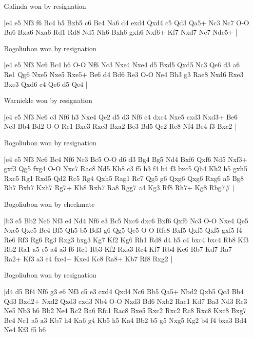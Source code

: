 \showboard

Galinda won by resignation

\makegametitle
|e4 e5 Nf3 f6 Bc4 b5 Bxb5 c6 Bc4 Na6 d4 exd4 Qxd4 c5 Qd3 Qa5+ Nc3 Nc7 O-O Ba6 Bxa6 Nxa6 Rd1 Rd8 Nd5 Nh6 Bxh6 gxh6 Nxf6+ Kf7 Nxd7 Nc7 Nde5+  |

\showboard

Bogoliubon won by resignation

\makegametitle
|e4 e5 Nf3 Nc6 Bc4 h6 O-O Nf6 Nc3 Nxe4 Nxe4 d5 Bxd5 Qxd5 Nc3 Qe6 d3 a6 Re1 Qg6 Nxe5 Nxe5 Rxe5+ Be6 d4 Bd6 Re3 O-O Ne4 Bh3 g3 Rae8 Nxd6 Rxe3 Bxe3 Qxd6 c4 Qe6 d5 Qe4  |

\showboard

Warnickle won by resignation

\makegametitle
|e4 e5 Nf3 Nc6 c3 Nf6 h3 Nxe4 Qe2 d5 d3 Nf6 c4 dxc4 Nxe5 cxd3 Nxd3+ Be6 Nc3 Bb4 Bd2 O-O Rc1 Bxc3 Rxc3 Bxa2 Be3 Bd5 Qc2 Re8 Nf4 Be4 f3 Bxc2  |

\showboard

Bogoliubon won by resignation

\makegametitle
|e4 e5 Nf3 Nc6 Bc4 Nf6 Nc3 Bc5 O-O d6 d3 Bg4 Bg5 Nd4 Bxf6 Qxf6 Nd5 Nxf3+ gxf3 Qg5 fxg4 O-O Nxc7 Rac8 Nd5 Kh8 c3 f5 h3 f4 b4 f3 bxc5 Qh4 Kh2 h5 gxh5 Rxc5 Rg1 Rxd5 Qd2 Rc5 Rg4 Qxh5 Rag1 Rc7 Qg5 g6 Qxg6 Qxg6 Rxg6 a5 Bg8 Rh7 Bxh7 Kxh7 Rg7+ Kh8 Rxb7 Ra8 Rgg7 a4 Kg3 Rf8 Rh7+ Kg8 Rbg7\#  |

\showboard

Bogoliubon won by checkmate

\makegametitle
|b3 e5 Bb2 Nc6 Nf3 e4 Nd4 Nf6 e3 Bc5 Nxc6 dxc6 Bxf6 Qxf6 Nc3 O-O Nxe4 Qe5 Nxc5 Qxc5 Bc4 Bf5 Qh5 b5 Bd3 g6 Qg5 Qe5 O-O Rfe8 Bxf5 Qxf5 Qxf5 gxf5 f4 Re6 Rf3 Rg6 Rg3 Rxg3 hxg3 Kg7 Kf2 Kg6 Rh1 Rd8 d4 h5 c4 bxc4 bxc4 Rb8 Kf3 Rb2 Ra1 a5 c5 a4 a3 f6 Rc1 Rb3 Kf2 Rxa3 Rc4 Kf7 Rb4 Ke6 Rb7 Kd7 Ra7 Ra2+ Kf3 a3 e4 fxe4+ Kxe4 Kc8 Ra8+ Kb7 Rf8 Rxg2  |

\showboard

Bogoliubon won by resignation

\makegametitle
|d4 d5 Bf4 Nf6 g3 e6 Nf3 c5 e3 cxd4 Qxd4 Nc6 Bb5 Qa5+ Nbd2 Qxb5 Qc3 Bb4 Qd3 Bxd2+ Nxd2 Qxd3 cxd3 Nb4 O-O Nxd3 Bd6 Nxb2 Rac1 Kd7 Ba3 Nd3 Rc3 Ne5 Nb3 b6 Bb2 Ne4 Rc2 Ba6 Rfc1 Rac8 Bxe5 Rxc2 Rxc2 Rc8 Rxc8 Kxc8 Bxg7 Bc4 Nc1 a5 a3 Kb7 h4 Ka6 g4 Kb5 h5 Ka4 Bb2 b5 g5 Nxg5 Kg2 b4 f4 bxa3 Bd4 Ne4 Kf3 f5 h6  |

